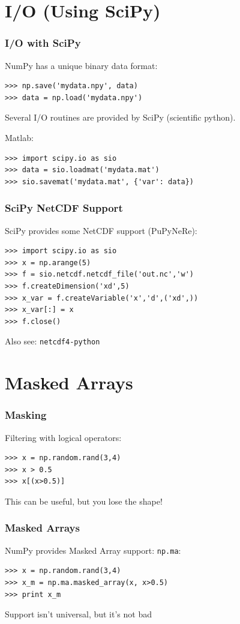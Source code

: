 \documentclass[red]{beamer}
\begin{document}
\section[I/O]{I/O (Using SciPy)}
\begin{frame}[fragile]
    \frametitle{I/O with SciPy}
    
    NumPy has a unique binary data format:
    \begin{lstlisting}
>>> np.save('mydata.npy', data)
>>> data = np.load('mydata.npy')
    \end{lstlisting}

    Several I/O routines are provided by SciPy (scientific python).

    Matlab:
    \begin{lstlisting}
>>> import scipy.io as sio
>>> data = sio.loadmat('mydata.mat')
>>> sio.savemat('mydata.mat', {'var': data})
    \end{lstlisting}
\end{frame}
\begin{frame}[fragile]
    \frametitle{SciPy NetCDF Support}

    SciPy provides some NetCDF support (PuPyNeRe):
    \begin{lstlisting}
>>> import scipy.io as sio
>>> x = np.arange(5)
>>> f = sio.netcdf.netcdf_file('out.nc','w')
>>> f.createDimension('xd',5)
>>> x_var = f.createVariable('x','d',('xd',))
>>> x_var[:] = x
>>> f.close()
    \end{lstlisting}
    Also see: \lstinline|netcdf4-python|
\end{frame}
\section{Masked Arrays}
\begin{frame}[fragile]
    \frametitle{Masking}

    Filtering with logical operators:
    \begin{lstlisting}
>>> x = np.random.rand(3,4)
>>> x > 0.5
>>> x[(x>0.5)]
    \end{lstlisting}
    This can be useful, but you lose the shape!
\end{frame}
\begin{frame}[fragile]
    \frametitle{Masked Arrays}

    NumPy provides Masked Array support: \lstinline|np.ma|:
    \begin{lstlisting}
>>> x = np.random.rand(3,4)
>>> x_m = np.ma.masked_array(x, x>0.5)
>>> print x_m
    \end{lstlisting}
    Support isn't universal, but it's not bad
\end{frame}
\end{document}
